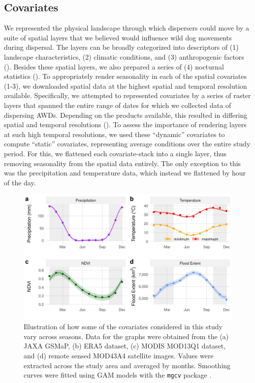 \documentclass[abstract=on,10pt,a4paper,bibliography=totocnumbered]{article}
\begin{document}
\subsection{Covariates}

We represented the physical landscape through which dispersers could move by a
suite of spatial layers that we believed would influence wild dog movements
during dispersal. The layers can be broadly categorized into descriptors of (1)
landscape characteristics, (2) climatic conditions, and (3) anthropogenic
factors (). Besides these spatial layers, we also prepared a
series of (4) nocturnal statistics (). To appropriately render
seasonality in each of the spatial covariates (1-3), we downloaded spatial data
at the highest spatial and temporal resolution available. Specifically, we
attempted to represented covariates by a series of raster layers that spanned
the entire range of dates for which we collected data of dispersing AWDs.
Depending on the products available, this resulted in differing spatial and
temporal resolutions (). To assess the importance of rendering
layers at such high temporal resolutions, we used these ``dynamic'' covariates
to compute ``static'' covariates, representing average conditions over the
entire study period. For this, we flattened each covariate-stack into a single
layer, thus removing seasonality from the spatial data entirely. The only
exception to this was the precipitation and temperature data, which instead we
flattened by hour of the day.

\begin{figure}
\begin{center}
  \includegraphics[width = \textwidth]{Figures/SeasonalCovariates.png}
  \caption{Illustration of how some of the covariates considered in this study
  vary across seasons. Data for the graphs were obtained from the (a) JAXA
  GSMaP, (b) ERA5 dataset, (c) MODIS MOD13Q1 dataset, and (d) remote sensed
  MOD43A4 satellite images. Values were extracted across the study area and
  averaged by months. Smoothing curves were fitted using GAM models with the
  \texttt{mgcv} package \citep{Wood.2011}.}
  \label{Seasonality}
\end{center}
\end{figure}
\end{document}
